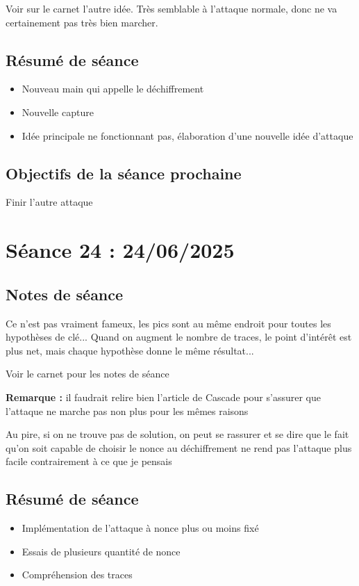 \documentclass[12pt]{article}
\newcommand{\cmark}{\ding{51}}%
\newcommand{\done}{\rlap{$\square$}{\raisebox{2pt}{\large\hspace{1pt}\cmark}}%
	\hspace{-2.5pt}}
\begin{document}
	\noindent Voir sur le carnet l'autre idée. Très semblable à l'attaque normale, donc ne va certainement pas très bien marcher.
	
	\subsection{Résumé de séance}
	\begin{itemize}
		\item Nouveau main qui appelle le déchiffrement
		\item Nouvelle capture
		\item Idée principale ne fonctionnant pas, élaboration d'une nouvelle idée d'attaque
	\end{itemize}
	
	\subsection{Objectifs de la séance prochaine}
	\begin{todolist}
		\item[\done] Finir l'autre attaque
	\end{todolist}
	
	
	\section{Séance 24 : 24/06/2025}
	\subsection{Notes de séance}
	Ce n'est pas vraiment fameux, les pics sont au même endroit pour toutes les hypothèses de clé... Quand on augment le nombre de traces, le point d'intérêt est plus net, mais chaque hypothèse donne le même résultat...
	
	\noindent Voir le carnet pour les notes de séance
	
	\noindent \textbf{Remarque :} il faudrait relire bien l'article de Cascade pour s'assurer que l'attaque ne marche pas non plus pour les mêmes raisons
	
	Au pire, si on ne trouve pas de solution, on peut se rassurer et se dire que le fait qu'on soit capable de choisir le nonce au déchiffrement ne rend pas l'attaque plus facile contrairement à ce que je pensais
	
	\subsection{Résumé de séance}
	\begin{itemize}
		\item Implémentation de l'attaque à nonce plus ou moins fixé
		\item Essais de plusieurs quantité de nonce
		\item Compréhension des traces
	\end{itemize}
	
\end{document}
